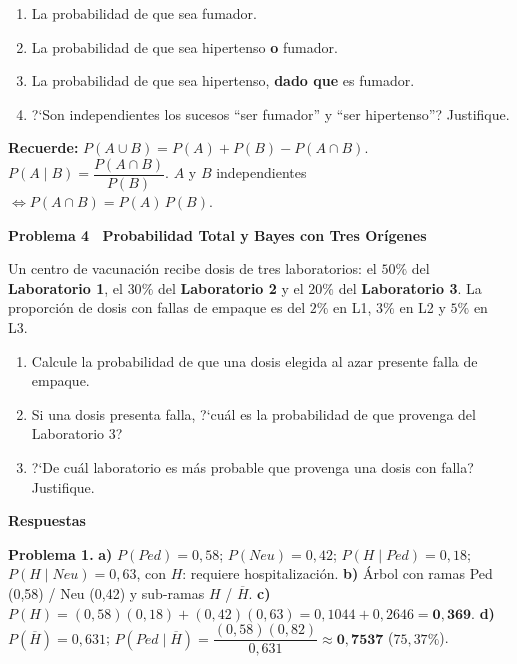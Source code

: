 \documentclass[10pt,letterpaper]{article}
\newcommand{\seccion}[1]{%
  \vspace{2pt}%
  \begin{tcolorbox}[enhanced,colback=white,colframe=black,arc=0pt,boxrule=0pt,
    leftrule=2pt,left=6pt,right=6pt,top=1pt,bottom=1pt]
    {\normalsize\bfseries\sffamily #1}
  \end{tcolorbox}%
  \vspace{1pt}%
}
\newcommand{\reglacaja}[1]{%
  \begin{tcolorbox}[enhanced,colback=white,colframe=black,arc=0pt,boxrule=0.5pt,
    left=6pt,right=6pt,top=2pt,bottom=2pt,breakable]
  \small\sffamily #1
  \end{tcolorbox}%
}
\begin{document}
\begin{enumerate}[leftmargin=1.2cm, label=\textbf{\alph*)}, itemsep=2pt, topsep=2pt]
  \item La probabilidad de que sea fumador.
  \item La probabilidad de que sea hipertenso \textbf{o} fumador.
  \item La probabilidad de que sea hipertenso, \textbf{dado que} es fumador.
  \item ?`Son independientes los sucesos ``ser fumador'' y ``ser hipertenso''? Justifique.
\end{enumerate}

\reglacaja{%
\textbf{Recuerde:} $P(A\cup B)=P(A)+P(B)-P(A\cap B)$.\quad
$P(A\mid B)=\dfrac{P(A\cap B)}{P(B)}$.\quad
$A$ y $B$ independientes $\iff P(A\cap B)=P(A)\,P(B)$.%
}

\seccion{Problema 4 \textendash\ Probabilidad Total y Bayes con Tres Or\'igenes}

\noindent\sffamily\small Un centro de vacunaci\'on recibe dosis de tres laboratorios: el $50\%$ del \textbf{Laboratorio 1}, el $30\%$ del \textbf{Laboratorio 2} y el $20\%$ del \textbf{Laboratorio 3}. La proporci\'on de dosis con fallas de empaque es del $2\%$ en L1, $3\%$ en L2 y $5\%$ en L3.

\begin{enumerate}[leftmargin=1.2cm, label=\textbf{\alph*)}, itemsep=2pt, topsep=2pt]
  \item Calcule la probabilidad de que una dosis elegida al azar presente falla de empaque.
  \item Si una dosis presenta falla, ?`cu\'al es la probabilidad de que provenga del Laboratorio 3?
  \item ?`De cu\'al laboratorio es m\'as probable que provenga una dosis con falla? Justifique.
\end{enumerate}

\newpage

\seccion{Respuestas}

\small\sffamily
\textbf{Problema 1.}
\textbf{a)} $P(Ped)=0{,}58$; $P(Neu)=0{,}42$; $P(H\mid Ped)=0{,}18$; $P(H\mid Neu)=0{,}63$, con $H$: requiere hospitalizaci\'on.
\textbf{b)} \'Arbol con ramas Ped (0{,}58) / Neu (0{,}42) y sub-ramas $H$ / $\overline{H}$.
\textbf{c)} $P(H)=(0{,}58)(0{,}18)+(0{,}42)(0{,}63)=0{,}1044+0{,}2646=\mathbf{0{,}369}$.
\textbf{d)} $P(\overline{H})=0{,}631$; $P(Ped\mid\overline{H})=\dfrac{(0{,}58)(0{,}82)}{0{,}631}\approx\mathbf{0{,}7537}$ ($75{,}37\%$).
\end{document}
